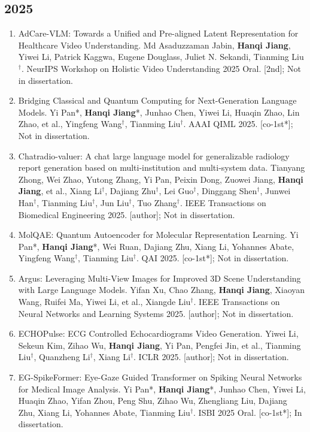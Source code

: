 {\subsection*{2025}
\begin{enumerate}\renewcommand{\labelenumi}{[\arabic{enumi}]}\setlength{\itemsep}{2pt}\setlength{\parsep}{0pt}\setlength{\topsep}{0pt}
\setcounter{enumi}{7}
\item AdCare-VLM: Towards a Unified and Pre-aligned Latent Representation for Healthcare Video Understanding. Md Asaduzzaman Jabin, \textbf{Hanqi Jiang}, Yiwei Li, Patrick Kaggwa, Eugene Douglass, Juliet N. Sekandi, Tianming Liu$^{\dagger}$. NeurIPS Workshop on Holistic Video Understanding 2025 Oral. [2nd]; Not in dissertation.
\item Bridging Classical and Quantum Computing for Next-Generation Language Models. Yi Pan*, \textbf{Hanqi Jiang}*, Junhao Chen, Yiwei Li, Huaqin Zhao, Lin Zhao, et al., Yingfeng Wang$^{\dagger}$, Tianming Liu$^{\dagger}$. AAAI QIML 2025. [co-1st*]; Not in dissertation.
\item Chatradio-valuer: A chat large language model for generalizable radiology report generation based on multi-institution and multi-system data. Tianyang Zhong, Wei Zhao, Yutong Zhang, Yi Pan, Peixin Dong, Zuowei Jiang, \textbf{Hanqi Jiang}, et al., Xiang Li$^{\dagger}$, Dajiang Zhu$^{\dagger}$, Lei Guo$^{\dagger}$, Dinggang Shen$^{\dagger}$, Junwei Han$^{\dagger}$, Tianming Liu$^{\dagger}$, Jun Liu$^{\dagger}$, Tuo Zhang$^{\dagger}$. IEEE Transactions on Biomedical Engineering 2025. [author]; Not in dissertation.
\item MolQAE: Quantum Autoencoder for Molecular Representation Learning. Yi Pan*, \textbf{Hanqi Jiang}*, Wei Ruan, Dajiang Zhu, Xiang Li, Yohannes Abate, Yingfeng Wang$^{\dagger}$, Tianming Liu$^{\dagger}$. QAI 2025. [co-1st*]; Not in dissertation.
\item Argus: Leveraging Multi-View Images for Improved 3D Scene Understanding with Large Language Models. Yifan Xu, Chao Zhang, \textbf{Hanqi Jiang}, Xiaoyan Wang, Ruifei Ma, Yiwei Li, et al., Xiangde Liu$^{\dagger}$. IEEE Transactions on Neural Networks and Learning Systems 2025. [author]; Not in dissertation.
\item ECHOPulse: ECG Controlled Echocardiograms Video Generation. Yiwei Li, Sekeun Kim, Zihao Wu, \textbf{Hanqi Jiang}, Yi Pan, Pengfei Jin, et al., Tianming Liu$^{\dagger}$, Quanzheng Li$^{\dagger}$, Xiang Li$^{\dagger}$. ICLR 2025. [author]; Not in dissertation.
\item EG-SpikeFormer: Eye-Gaze Guided Transformer on Spiking Neural Networks for Medical Image Analysis. Yi Pan*, \textbf{Hanqi Jiang}*, Junhao Chen, Yiwei Li, Huaqin Zhao, Yifan Zhou, Peng Shu, Zihao Wu, Zhengliang Liu, Dajiang Zhu, Xiang Li, Yohannes Abate, Tianming Liu$^{\dagger}$. ISBI 2025 Oral. [co-1st*]; In dissertation.

\end{enumerate}}
